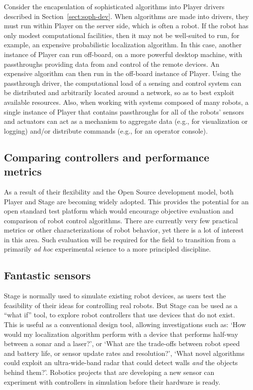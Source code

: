 \documentclass[a4paper]{ICAR2003}
\begin{document}
Consider the encapsulation of sophisticated algorithms into Player
drivers described in Section~\ref{sect:soph-dev}.  When algorithms are
made into drivers, they must run within Player on the server side,
which is often a robot.  If the robot has only modest computational
facilities, then it may not be well-suited to run, for example, an
expensive probabilistic localization algorithm.  In this case, another
instance of Player can run off-board, on a more powerful desktop machine,
with passthroughs providing data from and control of the remote devices.
An expensive algorithm can then run in the off-board instance of Player.
Using the passthrough driver, the computational load of a sensing and
control system can be distributed and arbitrarily located around a
network, so as to best exploit available resources.  Also, when working
with systems composed of many robots, a single instance of Player that
contains passthroughs for all of the robots' sensors and actuators can
act as a mechanism to aggregate data (e.g., for visualization or logging)
and/or distribute commands (e.g., for an operator console).

\subsection{Comparing controllers and performance metrics}
As a result of their flexibility and the Open Source development model,
both Player and Stage are becoming widely adopted. This provides the
potential for an open standard test platform which would encourage
objective evaluation and comparison of robot control algorithms. There
are currently very few practical metrics or other characterizations of
robot behavior, yet there is a lot of interest in this area. Such
evaluation will be required for the field to transition from a
primarily {\em ad hoc} experimental science to a more principled
discipline.

\subsection{Fantastic sensors}
Stage is normally used to simulate existing robot devices, as users
test the feasibility of their ideas for controlling real robots. But
Stage can be used as a ``what if'' tool, to explore robot controllers
that use devices that do not exist. This is useful as a conventional
design tool, allowing investigations such as: `How would my
localization algorithm perform with a device that performs half-way
between a sonar and a laser?', or `What are the trade-offs between
robot speed and battery life, or sensor update rates and resolution?',
`What novel algorithms could exploit an ultra-wide-band radar that
could detect walls {\it and} the objects behind them?'.  Robotics
projects that are developing a new sensor can experiment with
controllers in simulation before their hardware is ready.
\end{document}
